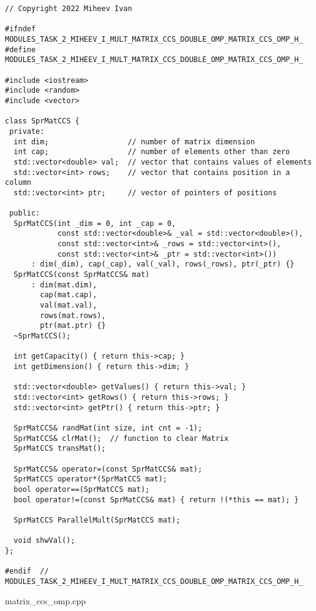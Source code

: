 \documentclass{report}
\begin{document}
\begin{lstlisting}
// Copyright 2022 Miheev Ivan

#ifndef MODULES_TASK_2_MIHEEV_I_MULT_MATRIX_CCS_DOUBLE_OMP_MATRIX_CCS_OMP_H_
#define MODULES_TASK_2_MIHEEV_I_MULT_MATRIX_CCS_DOUBLE_OMP_MATRIX_CCS_OMP_H_

#include <iostream>
#include <random>
#include <vector>

class SprMatCCS {
 private:
  int dim;                  // number of matrix dimension
  int cap;                  // number of elements other than zero
  std::vector<double> val;  // vector that contains values of elements
  std::vector<int> rows;    // vector that contains position in a column
  std::vector<int> ptr;     // vector of pointers of positions

 public:
  SprMatCCS(int _dim = 0, int _cap = 0,
            const std::vector<double>& _val = std::vector<double>(),
            const std::vector<int>& _rows = std::vector<int>(),
            const std::vector<int>& _ptr = std::vector<int>())
      : dim(_dim), cap(_cap), val(_val), rows(_rows), ptr(_ptr) {}
  SprMatCCS(const SprMatCCS& mat)
      : dim(mat.dim),
        cap(mat.cap),
        val(mat.val),
        rows(mat.rows),
        ptr(mat.ptr) {}
  ~SprMatCCS();

  int getCapacity() { return this->cap; }
  int getDimension() { return this->dim; }

  std::vector<double> getValues() { return this->val; }
  std::vector<int> getRows() { return this->rows; }
  std::vector<int> getPtr() { return this->ptr; }

  SprMatCCS& randMat(int size, int cnt = -1);
  SprMatCCS& clrMat();  // function to clear Matrix
  SprMatCCS transMat();

  SprMatCCS& operator=(const SprMatCCS& mat);
  SprMatCCS operator*(SprMatCCS mat);
  bool operator==(SprMatCCS mat);
  bool operator!=(const SprMatCCS& mat) { return !(*this == mat); }

  SprMatCCS ParallelMult(SprMatCCS mat);

  void shwVal();
};

#endif  // MODULES_TASK_2_MIHEEV_I_MULT_MATRIX_CCS_DOUBLE_OMP_MATRIX_CCS_OMP_H_
\end{lstlisting}

matrix\_ccs\_omp.cpp
\end{document}
